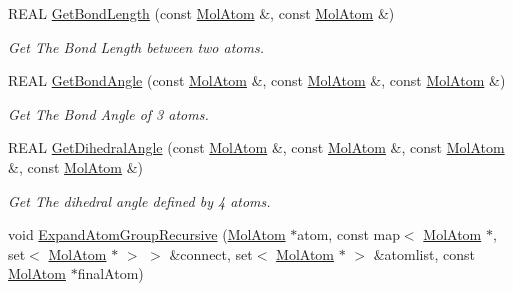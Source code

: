 \begin{DoxyCompactItemize}
\mbox{\label{namespace_obj_cryst_a1b8ee4ed3717968278182983f8a8a7b9}} 
R\+E\+AL \mbox{\hyperlink{namespace_obj_cryst_a1b8ee4ed3717968278182983f8a8a7b9}{Get\+Bond\+Length}} (const \mbox{\hyperlink{class_obj_cryst_1_1_mol_atom}{Mol\+Atom}} \&, const \mbox{\hyperlink{class_obj_cryst_1_1_mol_atom}{Mol\+Atom}} \&)
\begin{DoxyCompactList}\small\item\em Get The Bond Length between two atoms. \end{DoxyCompactList}\item 
\mbox{\label{namespace_obj_cryst_ad378f55096180bcac292460ddc816935}} 
R\+E\+AL \mbox{\hyperlink{namespace_obj_cryst_ad378f55096180bcac292460ddc816935}{Get\+Bond\+Angle}} (const \mbox{\hyperlink{class_obj_cryst_1_1_mol_atom}{Mol\+Atom}} \&, const \mbox{\hyperlink{class_obj_cryst_1_1_mol_atom}{Mol\+Atom}} \&, const \mbox{\hyperlink{class_obj_cryst_1_1_mol_atom}{Mol\+Atom}} \&)
\begin{DoxyCompactList}\small\item\em Get The Bond Angle of 3 atoms. \end{DoxyCompactList}\item 
\mbox{\label{namespace_obj_cryst_ad0dfebbddb95d5a57eceb1c7484d223d}} 
R\+E\+AL \mbox{\hyperlink{namespace_obj_cryst_ad0dfebbddb95d5a57eceb1c7484d223d}{Get\+Dihedral\+Angle}} (const \mbox{\hyperlink{class_obj_cryst_1_1_mol_atom}{Mol\+Atom}} \&, const \mbox{\hyperlink{class_obj_cryst_1_1_mol_atom}{Mol\+Atom}} \&, const \mbox{\hyperlink{class_obj_cryst_1_1_mol_atom}{Mol\+Atom}} \&, const \mbox{\hyperlink{class_obj_cryst_1_1_mol_atom}{Mol\+Atom}} \&)
\begin{DoxyCompactList}\small\item\em Get The dihedral angle defined by 4 atoms. \end{DoxyCompactList}\item 
void \mbox{\hyperlink{namespace_obj_cryst_a7471f9ecb181bcd28670b4921b5f7cae}{Expand\+Atom\+Group\+Recursive}} (\mbox{\hyperlink{class_obj_cryst_1_1_mol_atom}{Mol\+Atom}} $\ast$atom, const map$<$ \mbox{\hyperlink{class_obj_cryst_1_1_mol_atom}{Mol\+Atom}} $\ast$, set$<$ \mbox{\hyperlink{class_obj_cryst_1_1_mol_atom}{Mol\+Atom}} $\ast$ $>$ $>$ \&connect, set$<$ \mbox{\hyperlink{class_obj_cryst_1_1_mol_atom}{Mol\+Atom}} $\ast$ $>$ \&atomlist, const \mbox{\hyperlink{class_obj_cryst_1_1_mol_atom}{Mol\+Atom}} $\ast$final\+Atom)

\end{DoxyCompactItemize}
